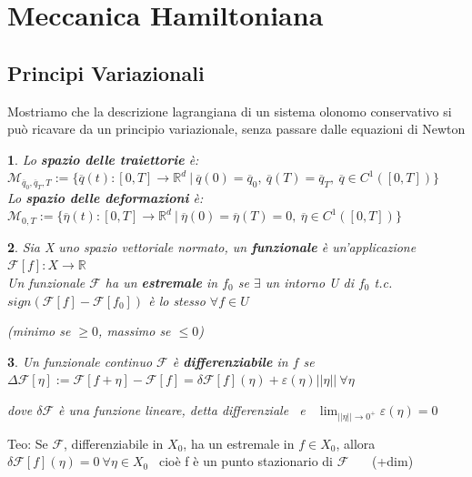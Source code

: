 \documentclass{article}
\theoremstyle{unnumbered}
\theoremstyle{unnumbered1}
\newtheorem* {theoremT1}{}
\newenvironment{Ndefi}{\begin{gBox}\begin{theoremT1}}{\end{theoremT1}\end{gBox}}
\begin{document}


\section{Meccanica Hamiltoniana}

\subsection{Principi Variazionali}
%
Mostriamo che la descrizione lagrangiana di un sistema olonomo conservativo si può ricavare da un principio variazionale, senza passare dalle equazioni di Newton\\
%
\begin{Ndefi}
Lo \textbf{spazio delle traiettorie} è: \ \ \ $\mathcal{M}_{\overline{q}_0,\overline{q}_T,T}:=\{\overline{q}(t):[0,T]\rightarrow \mathbb{R}^d \ |\ \overline{q}(0)=\overline{q}_0,\ \overline{q}(T)= \overline{q}_T , \ \overline{q}\in C^1([0,T])\}$\\
Lo \textbf{spazio delle deformazioni} è: \ \ \ $\mathcal{M}_{0,T}:=\{\overline{\eta}(t):[0,T]\rightarrow \mathbb{R}^d \ |\ \overline{\eta}(0)=\overline{\eta}(T)=0, \ \overline{\eta}\in C^1([0,T])\}$
\end{Ndefi}
%
%
%
\begin{Ndefi}
Sia X uno spazio vettoriale normato, un \textbf{funzionale} è un'applicazione $\mathcal{F}[f]:X\rightarrow \mathbb{R}$\\
%
Un funzionale $\mathcal{F}$ ha un \textbf{estremale} in $f_0$ se $\exists$ un intorno U di $f_0$ t.c. $sign(\mathcal{F}[f]-\mathcal{F}[f_0])$ è lo stesso $\forall f \in U$

(minimo se $\ge0$, massimo se $\le0$)
\end{Ndefi}
%
%
%
\begin{Ndefi}
Un funzionale continuo $\mathcal{F}$ è \textbf{differenziabile} in $f$ se \ $\Delta\mathcal{F}[\eta]:= \mathcal{F}[f+\eta]-\mathcal{F}[f] = \delta\mathcal{F}[f](\eta) + \varepsilon(\eta)||\eta|| \ \forall \eta$

dove $\delta\mathcal{F}$ è una funzione lineare, detta differenziale \ e \ $\lim_{||\eta||\to 0^+}\varepsilon(\eta)=0$
\end{Ndefi}
%
Teo: Se $\mathcal{F}$, differenziabile  in $X_0$, ha un estremale in $f\in X_0 $, allora \\
\phantom{Teo: }$\delta\mathcal{F}[f](\eta)=0 \ \forall \eta \in X_0$ \ cioè f è un punto stazionario di $\mathcal{F}$ \ \ \ (+dim) \\ \\
\end{document}
